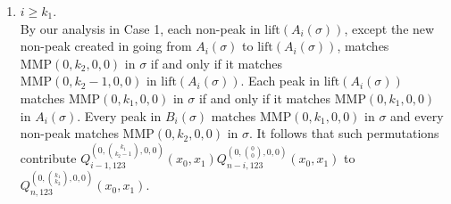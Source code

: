 \documentclass[
final,nomarks
]{dmtcs-episciences}
\newcommand{\lift}{\mathrm{lift}}
\newcommand{\Qmzn}[3]{Q_{#3,123}^{(0,\binom{#1}{#2},0,0)}(x_0,x_1)}
\newcommand{\Qmznx}[4]{Q_{#3,123}^{(0,\binom{#1}{#2},0,0)}(#4)}
\newcommand{\MMP}{\mathrm{MMP}}
\begin{document}
\begin{enumerate}[{\bf Case }\bf 1.]
	\item \begin{math}i \geq  k_1\end{math}. \\
	By our analysis in Case 1, each non-peak in \begin{math}\lift(A_i(\sigma))\end{math}, except the new non-peak created 
	in going from \begin{math}A_i(\sigma)\end{math} to \begin{math}\mathrm{lift}(A_i(\sigma))\end{math}, matches 
	\begin{math}\MMP(0,k_2,0,0)\end{math} in \begin{math}\sigma\end{math} if and only if it matches  \\
	\begin{math}\MMP(0,k_2-1,0,0)\end{math} in \begin{math}\lift(A_i(\sigma))\end{math}.
	Each peak in \begin{math}\lift(A_i(\sigma))\end{math} matches \begin{math}\MMP(0,k_1,0,0)\end{math} in \begin{math}\sigma\end{math} if and only if it 
	matches \begin{math}\MMP(0,k_1,0,0)\end{math} in \begin{math}A_i(\sigma)\end{math}. Every peak in \begin{math}B_i(\sigma)\end{math} matches 
	\begin{math}\MMP(0,k_1,0,0)\end{math} in \begin{math}\sigma\end{math} and every non-peak matches \begin{math}\MMP(0,k_2,0,0)\end{math} in 
	\begin{math}\sigma\end{math}. It follows that such permutations contribute 
	\begin{math}\Qmznx{k_1}{k_2-1}{i-1}{x_0,x_1}\Qmzn{0}{0}{n-i}\end{math} to 
	\begin{math}\Qmzn{k_1}{k_2}{n}\end{math}.
	
\end{enumerate}
\end{document}
